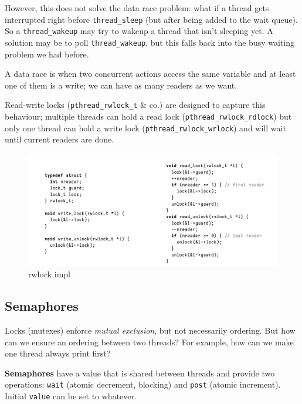 \documentclass[../notes.tex]{subfiles}
\begin{document}
However, this does not solve the data race problem: what if a thread gets interrupted right before \texttt{thread\_sleep} (but after being added to the wait queue). So a \texttt{thread\_wakeup} may try to wakeup a thread that isn't sleeping yet.
 A solution may be to poll \texttt{thread\_wakeup}, but this falls back into the busy waiting problem we had before.

A data race is when two concurrent actions access the same variable and at least one of them is a write; we can have as many readers as we want.

Read-write locks (\texttt{pthread\_rwlock\_t} \& co.) are designed to capture this behaviour; multiple threads can hold a read lock (\texttt{pthread\_rwlock\_rdlock}) but only one thread can hold a write lock (\texttt{pthread\_rwlock\_wrlock}) and will wait until current readers are done.

\begin{figure}[H]
    \centering
    \includegraphics[width=0.8\linewidth]{img/image_2023-03-08-14-02-08.png}
    \caption{rwlock impl}
\end{figure}



\subsection{Semaphores}

Locks (mutexes) enforce \textit{mutual exclusion}, but not necessarily ordering.
But how can we ensure an ordering between two threads?
For example, how can we make one thread always print first?

\begin{definition}
    \textbf{Semaphores} have a value that is shared between threads and provide two operations: \texttt{wait} (atomic decrement, blocking) and \texttt{post} (atomic increment).
    Initial \texttt{value} can be set to whatever.
\end{definition}
\end{document}
